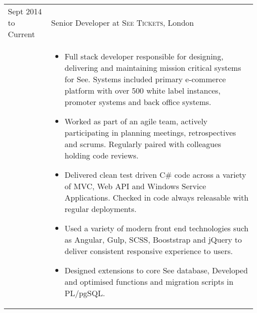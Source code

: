 \documentclass[a4paper,10pt]{article} %
\begin{document}
\begin{tabular}{ L{2cm} | L{11cm}}	



Sept 2014 to Current & Senior Developer at \textsc{See Tickets}, London \\

 
 

 
&\MPtrue	   
\begin{itemize}[leftmargin=*]
 
 
 
		\item Full stack developer responsible for designing, delivering and maintaining mission critical systems for See. Systems included primary e-commerce platform with over 500 white label instances, promoter systems and back office systems. 

		\item Worked as part of an agile team, actively participating in planning meetings, retrospectives and scrums. Regularly paired with colleagues holding code reviews. 

		\item Delivered clean test driven C\# code across a variety of MVC, Web API and Windows Service Applications. Checked in code always releasable with regular deployments. 

		\item Used a variety of modern front end technologies such as Angular, Gulp, SCSS, Booststrap and jQuery to deliver consistent responsive experience to users. 
		
		\item Designed extensions to core See database, Developed and optimised functions and migration scripts in PL/pgSQL. 


\end{itemize}
\end{tabular}
\end{document}
